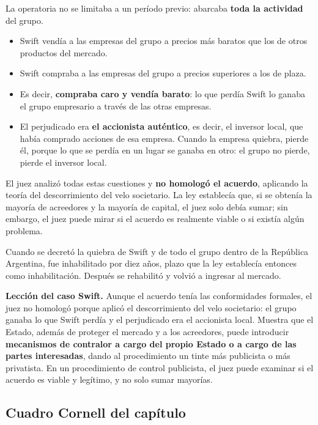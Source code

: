 \documentclass[12pt,oneside]{book}
\begin{document}
La operatoria no se limitaba a un período previo: abarcaba \textbf{toda la actividad} del grupo.

\begin{itemize}
    \item Swift vendía a las empresas del grupo a precios más baratos que los de otros productos del mercado.
    \item Swift compraba a las empresas del grupo a precios superiores a los de plaza.
    \item Es decir, \textbf{compraba caro y vendía barato}: lo que perdía Swift lo ganaba el grupo empresario a través de las otras empresas.
    \item El perjudicado era \textbf{el accionista auténtico}, es decir, el inversor local, que había comprado acciones de esa empresa. Cuando la empresa quiebra, pierde él, porque lo que se perdía en un lugar se ganaba en otro: el grupo no pierde, pierde el inversor local.
\end{itemize}

El juez analizó todas estas cuestiones y \textbf{no homologó el acuerdo}, aplicando la teoría del descorrimiento del velo societario. La ley establecía que, si se obtenía la mayoría de acreedores y la mayoría de capital, el juez solo debía sumar; sin embargo, el juez puede mirar si el acuerdo es realmente viable o si existía algún problema.

Cuando se decretó la quiebra de Swift y de todo el grupo dentro de la República Argentina, fue inhabilitado por diez años, plazo que la ley establecía entonces como inhabilitación. Después se rehabilitó y volvió a ingresar al mercado.

\begin{important}
\textbf{Lección del caso Swift.} Aunque el acuerdo tenía las conformidades formales, el juez no homologó porque aplicó el descorrimiento del velo societario: el grupo ganaba lo que Swift perdía y el perjudicado era el accionista local. Muestra que el Estado, además de proteger el mercado y a los acreedores, puede introducir \textbf{mecanismos de contralor a cargo del propio Estado o a cargo de las partes interesadas}, dando al procedimiento un tinte más publicista o más privatista. En un procedimiento de control publicista, el juez puede examinar si el acuerdo es viable y legítimo, y no solo sumar mayorías.
\end{important}

\subsection*{Cuadro Cornell del capítulo}
\end{document}
